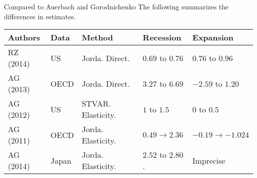 \documentclass{beamer}
\begin{document}
\begin{frame}{Compared to Auerbach and Gorodnichenko}
  The following summarizes the differences in estimates.
  \begin{center}
    \small
    \begin{tabular}{lll ll}
      \toprule
      Authors
      & Data
      & Method
      & Recession
      & Expansion \\\midrule

      RZ (2014)
      & US
      & Jorda. Direct. %
      & $0.69$ to $0.76$
      & $0.76$ to $0.96$ \\

      AG (2013)
      & OECD %
      & Jorda. Direct. %
      & $3.27$ to $6.69$
      & $-2.59$ to $1.20$ \\

      AG (2012)
      & US %
      & STVAR. Elasticity. %
      & $1$ to $1.5$ %
      & $0$ to $0.5$ %
      \\

      AG (2011)
      & OECD %
      & Jorda. Elasticity. %
      & $0.49 \to 2.36$
      & $-0.19 \to -1.024$ \\

      AG (2014)
      & Japan %
      & Jorda. Elasticity.
      & $2.52$ to $2.80$.
      & Imprecise \\ %
    \end{tabular}
  \end{center}
\end{frame}
\end{document}
